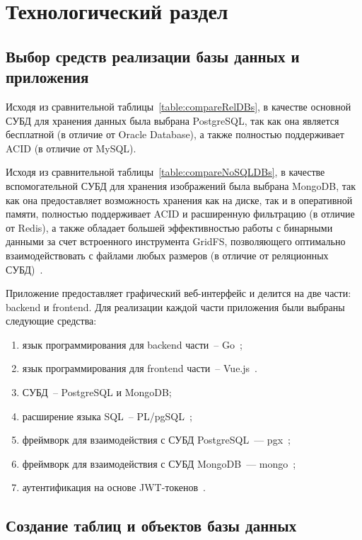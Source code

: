 \chapter{Технологический раздел}

\section{Выбор средств реализации базы данных и приложения}

Исходя из сравнительной таблицы~\ref{table:compareRelDBs}, в качестве основной СУБД для хранения данных была выбрана PostgreSQL, так как она является бесплатной (в отличие от Oracle Database), а также полностью поддерживает ACID (в отличие от MySQL).

Исходя из сравнительной таблицы~\ref{table:compareNoSQLDBs}, в качестве вспомогательной СУБД для хранения изображений была выбрана MongoDB, так как она предоставляет возможность хранения как на диске, так и в оперативной памяти, полностью поддерживает ACID и расширенную фильтрацию (в отличие от Redis), а также обладает большей эффективностью работы с бинарными данными за счет встроенного инструмента GridFS, позволяющего оптимально взаимодействовать с файлами любых размеров (в отличие от реляционных СУБД)~\cite{cmpNosqlSCDB, cmpStoreBinary, cmpStoreBinary1}.

Приложение предоставляет графический веб-интерфейс и делится на две части: backend и frontend.
Для реализации каждой части приложения были выбраны следующие средства:
\begin{enumerate}
	\item язык программирования для backend части~-- Go~\cite{go};
	\item язык программирования для frontend части~-- Vue.js~\cite{vue}.
	\item СУБД~-- PostgreSQL и MongoDB;
	\item расширение языка SQL~-- PL/pgSQL~\cite{plpg};
	\item фреймворк для взаимодействия с СУБД PostgreSQL~--- pgx~\cite{pgx};
	\item фреймворк для взаимодействия с СУБД MongoDB~--- mongo~\cite{mongogo};
	\item аутентификация на основе JWT-токенов~\cite{jwt}.
\end{enumerate}

\clearpage

\section{Создание таблиц и объектов базы данных}

